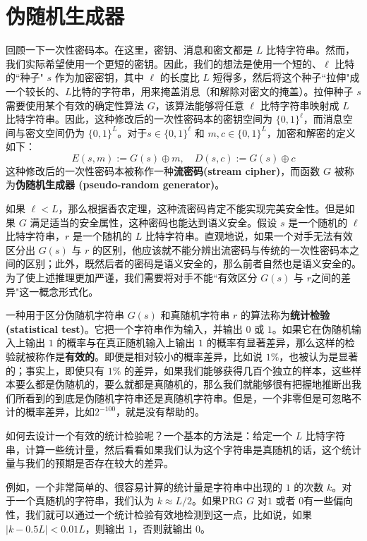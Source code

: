 \section{伪随机生成器}

回顾一下一次性密码本。在这里，密钥、消息和密文都是 $L$ 比特字符串。然而，我们实际希望使用一个更短的密钥。因此，我们的想法是使用一个短的、$\ell$ 比特的``种子" $s$ 作为加密密钥，其中 $\ell$ 的长度比 $L$ 短得多，然后将这个种子``拉伸"成一个较长的、$L$比特的字符串，用来掩盖消息（和解除对密文的掩盖）。拉伸种子 $s$ 需要使用某个有效的确定性算法 $G$，该算法能够将任意 $\ell$ 比特字符串映射成 $L$ 比特字符串。因此，这种修改后的一次性密码本的密钥空间为 $\{0,1\}^\ell$，而消息空间与密文空间仍为 $\{0,1\}^L$。对于$s\in\{0,1\}^\ell$ 和 $m,c\in\{0,1\}^L$，加密和解密的定义如下：
$$
E(s,m):=G(s)\oplus m,\quad
D(s,c):=G(s)\oplus c
$$
这种修改后的一次性密码本被称作一种\textbf{流密码(stream cipher)}，而函数 $G$ 被称为\textbf{伪随机生成器 (pseudo-random generator)}。

如果 $\ell<L$，那么根据香农定理，这种流密码肯定不能实现完美安全性。但是如果 $G$ 满足适当的安全属性，这种密码也能达到语义安全。假设 $s$ 是一个随机的 $\ell$ 比特字符串，$r$ 是一个随机的 $L$ 比特字符串。直观地说，如果一个对手无法有效区分出 $G(s)$ 与 $r$ 的区别，他应该就不能分辨出流密码与传统的一次性密码本之间的区别；此外，既然后者的密码是语义安全的，那么前者自然也是语义安全的。为了使上述推理更加严谨，我们需要将对手不能``有效区分 $G(s)$ 与 $r$之间的差异"这一概念形式化。

一种用于区分伪随机字符串 $G(s)$ 和真随机字符串 $r$ 的算法称为\textbf{统计检验(statistical test)}。它把一个字符串作为输入，并输出 $0$ 或 $1$。如果它在伪随机输入上输出 $1$ 的概率与在真正随机输入上输出 $1$ 的概率有显著差异，那么这样的检验就被称作是\textbf{有效的}。即便是相对较小的概率差异，比如说 $1\%$，也被认为是显著的；事实上，即使只有 $1\%$ 的差异，如果我们能够获得几百个独立的样本，这些样本要么都是伪随机的，要么就都是真随机的，那么我们就能够很有把握地推断出我们所看到的到底是伪随机字符串还是真随机字符串。但是，一个非零但是可忽略不计的概率差异，比如$2^{-100}$，就是没有帮助的。

如何去设计一个有效的统计检验呢？一个基本的方法是：给定一个 $L$ 比特字符串，计算一些统计量，然后看看如果我们认为这个字符串是真随机的话，这个统计量与我们的预期是否存在较大的差异。

例如，一个非常简单的、很容易计算的统计量是字符串中出现的 $1$ 的次数 $k$。对于一个真随机的字符串，我们认为 $k\approx{L}/{2}$。如果PRG $G$ 对$1$ 或者 $0$有一些偏向性，我们就可以通过一个统计检验有效地检测到这一点，比如说，如果 $|k-0.5L|<0.01L$，则输出 $1$，否则就输出 $0$。

